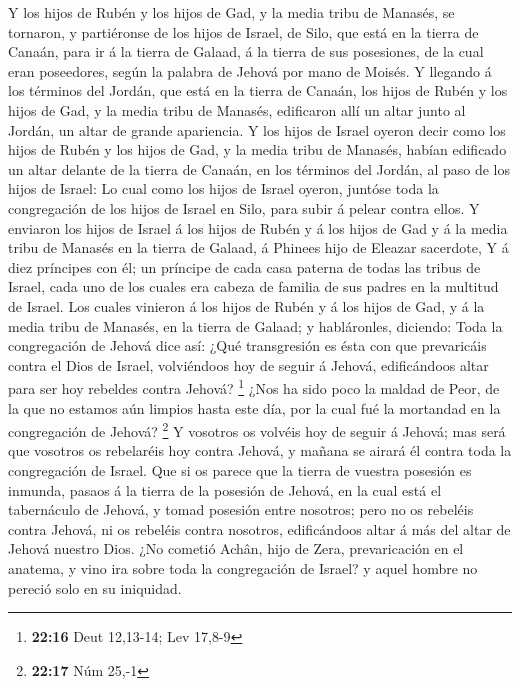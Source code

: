 Y los hijos de Rubén y los hijos de Gad, y la media tribu
de Manasés, se tornaron, y partiéronse de los hijos de Israel, de Silo,
que está en la tierra de Canaán, para ir á la tierra de Galaad, á la
tierra de sus posesiones, de la cual eran poseedores, según la palabra
de Jehová por mano de Moisés.  Y llegando á los términos
del Jordán, que está en la tierra de Canaán, los hijos de Rubén y los
hijos de Gad, y la media tribu de Manasés, edificaron allí un altar
junto al Jordán, un altar de grande apariencia.  Y los
hijos de Israel oyeron decir como los hijos de Rubén y los hijos de Gad,
y la media tribu de Manasés, habían edificado un altar delante de la
tierra de Canaán, en los términos del Jordán, al paso de los hijos de
Israel:  Lo cual como los hijos de Israel oyeron, juntóse
toda la congregación de los hijos de Israel en Silo, para subir á pelear
contra ellos.  Y enviaron los hijos de Israel á los hijos
de Rubén y á los hijos de Gad y á la media tribu de Manasés en la tierra
de Galaad, á Phinees hijo de Eleazar sacerdote,  Y á diez
príncipes con él; un príncipe de cada casa paterna de todas las tribus
de Israel, cada uno de los cuales era cabeza de familia de sus padres en
la multitud de Israel.  Los cuales vinieron á los hijos
de Rubén y á los hijos de Gad, y á la media tribu de Manasés, en la
tierra de Galaad; y habláronles, diciendo:  Toda la
congregación de Jehová dice así: ¿Qué transgresión es ésta con que
prevaricáis contra el Dios de Israel, volviéndoos hoy de seguir á
Jehová, edificándoos altar para ser hoy rebeldes contra Jehová?
\footnote{\textbf{22:16} Deut 12,13-14; Lev 17,8-9}  ¿Nos
ha sido poco la maldad de Peor, de la que no estamos aún limpios hasta
este día, por la cual fué la mortandad en la congregación de Jehová?
\footnote{\textbf{22:17} Núm 25,-1}  Y vosotros os
volvéis hoy de seguir á Jehová; mas será que vosotros os rebelaréis hoy
contra Jehová, y mañana se airará él contra toda la congregación de
Israel.  Que si os parece que la tierra de vuestra
posesión es inmunda, pasaos á la tierra de la posesión de Jehová, en la
cual está el tabernáculo de Jehová, y tomad posesión entre nosotros;
pero no os rebeléis contra Jehová, ni os rebeléis contra nosotros,
edificándoos altar á más del altar de Jehová nuestro Dios.
 ¿No cometió Achân, hijo de Zera, prevaricación en el
anatema, y vino ira sobre toda la congregación de Israel? y aquel hombre
no pereció solo en su iniquidad.

